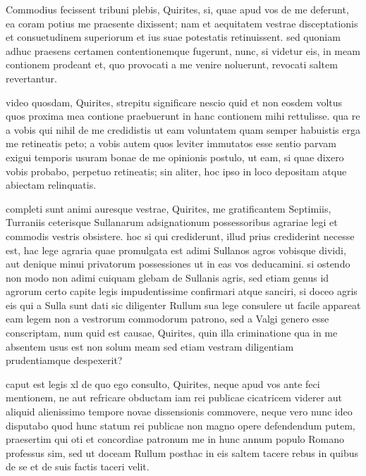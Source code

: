 
 Commodius fecissent tribuni plebis, Quirites, si, quae apud vos de me deferunt, ea coram potius me praesente dixissent; nam et aequitatem vestrae disceptationis et consuetudinem superiorum et ius suae potestatis retinuissent. sed quoniam adhuc praesens certamen contentionemque fugerunt, nunc, si videtur eis, in meam contionem prodeant et, quo provocati a me venire noluerunt, revocati saltem revertantur.

 video quosdam, Quirites, strepitu significare nescio quid et non eosdem voltus quos proxima mea contione praebuerunt in hanc contionem mihi rettulisse. qua re a vobis qui nihil de me credidistis ut eam voluntatem quam semper habuistis erga me retineatis peto; a vobis autem quos leviter immutatos esse sentio parvam exigui temporis usuram bonae de me opinionis postulo, ut eam, si quae dixero vobis probabo, perpetuo retineatis; sin aliter, hoc ipso in loco depositam atque abiectam relinquatis.

 completi sunt animi auresque vestrae, Quirites, me gratificantem Septimiis, Turraniis ceterisque Sullanarum adsignationum possessoribus agrariae legi et commodis vestris obsistere. hoc si qui crediderunt, illud prius crediderint necesse est, hac lege agraria quae promulgata est adimi Sullanos agros vobisque dividi, aut denique minui privatorum possessiones ut in eas vos deducamini. si ostendo non modo non adimi cuiquam glebam de Sullanis agris, sed etiam genus id agrorum certo capite legis impudentissime confirmari atque sanciri, si doceo agris eis qui a Sulla sunt dati sic diligenter Rullum sua lege consulere ut facile appareat eam legem non a vestrorum commodorum patrono, sed a Valgi genero esse conscriptam, num quid est causae, Quirites, quin illa criminatione qua in me absentem usus est non solum meam sed etiam vestram diligentiam prudentiamque despexerit?

 caput est legis xl de quo ego consulto, Quirites, neque apud vos ante feci mentionem, ne aut refricare obductam iam rei publicae cicatricem viderer aut aliquid alienissimo tempore novae dissensionis commovere, neque vero nunc ideo disputabo quod hunc statum rei publicae non magno opere defendendum putem, praesertim qui oti et concordiae patronum me in hunc annum populo Romano professus sim, sed ut doceam Rullum posthac in eis saltem tacere rebus in quibus de se et de suis factis taceri velit.

